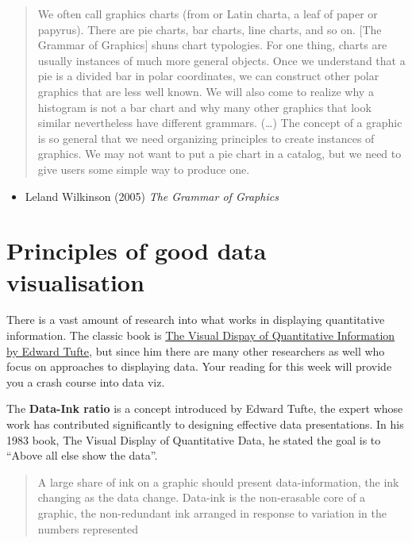 \documentclass[]{book}
\providecommand{\tightlist}{%
  \setlength{\itemsep}{0pt}\setlength{\parskip}{0pt}}
\theoremstyle{definition}
\theoremstyle{definition}
\theoremstyle{definition}
\theoremstyle{remark}
\begin{document}
\begin{quote}
We often call graphics charts (from or Latin charta, a leaf of paper or
papyrus). There are pie charts, bar charts, line charts, and so on.
{[}The Grammar of Graphics{]} shuns chart typologies. For one thing,
charts are usually instances of much more general objects. Once we
understand that a pie is a divided bar in polar coordinates, we can
construct other polar graphics that are less well known. We will also
come to realize why a histogram is not a bar chart and why many other
graphics that look similar nevertheless have different grammars.
(\ldots{}) The concept of a graphic is so general that we need
organizing principles to create instances of graphics. We may not want
to put a pie chart in a catalog, but we need to give users some simple
way to produce one.
\end{quote}

\begin{itemize}
\tightlist
\item
  Leland Wilkinson (2005) \emph{The Grammar of Graphics}
\end{itemize}

\hypertarget{principles-of-good-data-visualisation}{%
\section{Principles of good data
visualisation}\label{principles-of-good-data-visualisation}}

There is a vast amount of research into what works in displaying
quantitative information. The classic book is
\href{https://www.edwardtufte.com/tufte/books_vdqi}{The Visual Dispay of
Quantitative Information by Edward Tufte}, but since him there are many
other researchers as well who focus on approaches to displaying data.
Your reading for this week will provide you a crash course into data
viz.

The \textbf{Data-Ink ratio} is a concept introduced by Edward Tufte, the
expert whose work has contributed significantly to designing effective
data presentations. In his 1983 book, The Visual Display of Quantitative
Data, he stated the goal is to ``Above all else show the data''.

\begin{quote}
A large share of ink on a graphic should present data-information, the
ink changing as the data change. Data-ink is the non-erasable core of a
graphic, the non-redundant ink arranged in response to variation in the
numbers represented
\end{quote}
\end{document}
